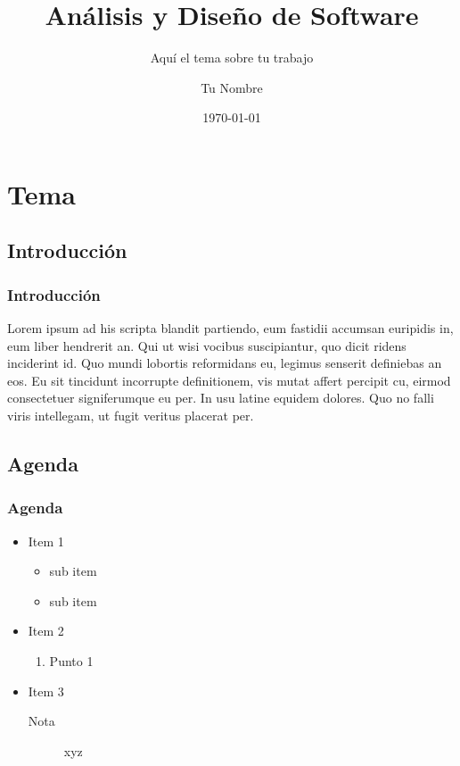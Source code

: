 \documentclass{beamer}
\title{Análisis y Diseño de Software}
\subtitle{Aquí el tema sobre tu trabajo}
\author{Tu Nombre}
\date{\today}
\institute{Universidad Nacional de Loja \\ tucorreo@unl.edu.ec}
\begin{document}
	
	\begin{frame}[plain,t]
		\titlepage
	\end{frame}

	\section{Tema}

	\subsection{Introducción}
		\begin{frame}
			\frametitle{Introducción}
			Lorem ipsum ad his scripta blandit partiendo, eum fastidii accumsan euripidis in, eum liber hendrerit an. Qui ut wisi 					vocibus suscipiantur, quo dicit ridens inciderint id. Quo mundi lobortis reformidans eu, legimus senserit 								definiebas an eos. Eu sit tincidunt incorrupte definitionem, vis mutat affert percipit cu, eirmod 										consectetuer signiferumque eu per. In usu latine equidem 		dolores. Quo no falli viris intellegam, ut fugit veritus 					placerat per.
\end{frame}

\subsection{Agenda}
\begin{frame}
\frametitle{Agenda}
\begin{itemize}
\item Item 1
	\begin{itemize}
	\item sub item
	\item sub item
	\end{itemize}
\item Item 2
	\begin{enumerate}
	\item Punto 1
	\end{enumerate}
\item Item 3
	\begin{description}
	\item[Nota] xyz
	\end{description}
\end{itemize}
\end{frame}
\end{document}
